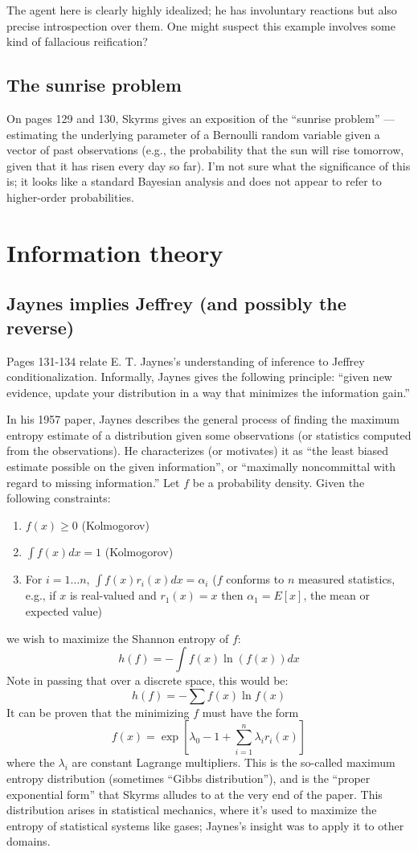 \documentclass[letterpaper,12pt]{article}
\begin{document}
The agent here is clearly highly idealized; he has involuntary reactions but also precise introspection over them. One might suspect this example involves some kind of fallacious reification?

\subsection{The sunrise problem}
On pages 129 and 130, Skyrms gives an exposition of the ``sunrise problem'' --- estimating the underlying parameter of a Bernoulli random variable given a vector of past observations (e.g., the probability that the sun will rise tomorrow, given that it has risen every day so far). I'm not sure what the significance of this is; it looks like a standard Bayesian analysis and does not appear to refer to higher-order probabilities.

\section{Information theory}
\subsection{Jaynes implies Jeffrey (and possibly the reverse)}
Pages 131-134 relate E. T. Jaynes's understanding of inference to Jeffrey conditionalization. Informally, Jaynes gives the following principle: ``given new evidence, update your distribution in a way that minimizes the information gain.''

In his 1957 paper, Jaynes describes the general process of finding the maximum entropy estimate of a distribution given some observations (or statistics computed from the observations). He characterizes (or motivates) it as ``the least biased estimate possible on the given information'', or ``maximally noncommittal with regard to missing information.'' Let $f$ be a probability density. Given the following constraints:
\begin{enumerate}
\item
$f(x) \geq 0$ (Kolmogorov)
\item
$\int f(x) dx = 1$ (Kolmogorov)
\item
For $i = 1 \ldots n$, $\int f(x) r_i(x) dx = \alpha_i$ ($f$ conforms to $n$ measured statistics, e.g., if $x$ is real-valued and $r_1(x) = x$ then $\alpha_1 = E[x]$, the mean or expected value)
\end{enumerate}
we wish to maximize the Shannon entropy of $f$:
$$h(f) = - \int f(x) \ln (f(x)) dx$$
Note in passing that over a discrete space, this would be:
$$h(f) = - \sum f(x) \ln f(x)$$
It can be proven that the minimizing $f$ must have the form
$$f(x) = \exp [\lambda_0 - 1 + \sum_{i=1}^n \lambda_i r_i(x)]$$
where the $\lambda_i$ are constant Lagrange multipliers. This is the so-called maximum entropy distribution (sometimes ``Gibbs distribution''), and is the ``proper exponential form'' that Skyrms alludes to at the very end of the paper. This distribution arises in statistical mechanics, where it's used to maximize the entropy of statistical systems like gases; Jaynes's insight was to apply it to other domains.
\end{document}
